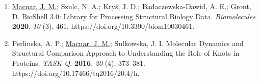 \documentclass[verylight]{simplehipstercv}
\begin{document}
\begin{paracol}{2}
{\begin{minipage}[t]{0.7\textwidth}
\begin{enumerate}
    \item \underline{Macnar, J. M.}; Szulc, N. A.; Kryś, J. D.; Badaczewska-Dawid, A. E.; Gront, D. BioShell 3.0: Library for Processing Structural Biology Data. \textit{Biomolecules} \textbf{2020}, \textit{10} (3), 461. https://doi.org/10.3390/biom10030461.\vspace{-0.4em}
    \item Perlinska, A. P.; \underline{Macnar, J. M.}; Sulkowska, J. I. Molecular Dynamics and Structural Comparison Approach to Understanding the Role of Knots in Proteins. \textit{TASK Q.} \textbf{2016}, \textit{20} (4), 373–381. https://doi.org/10.17466/tq2016/20.4/h.\vspace{-0.15em}
\end{enumerate}

{\vspace{0.5mm}}
\end{minipage}
}
\end{paracol}
\end{document}

